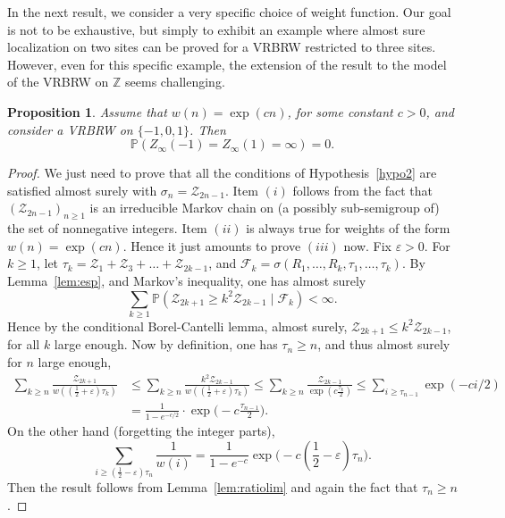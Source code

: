 \documentclass[10pt,a4paper]{amsart}
\newtheorem {prop} {Proposition} [section]
\newcommand{\1}{{\text{\Large $\mathfrak 1$}}}
\begin{document}
In the next result, we consider a very specific choice of weight function. Our goal is not to be exhaustive, but simply 
to exhibit an example where almost sure localization on 
two sites can be proved for a VRBRW restricted to three sites. However, even for this specific example, the extension of the result to the model of the VRBRW on $\mathbb Z$ seems challenging. 
\begin{prop}\label{prop:appVRBRW}
Assume that $w(n) = \exp(cn)$, for some constant $c>0$, and consider a VRBRW on $\{-1,0,1\}$. Then  
$$\mathbb  P(Z_\infty(-1)= Z_\infty(1) = \infty)= 0. $$ 
\end{prop}
\begin{proof}
We just need to prove that all the conditions of Hypothesis~\ref{hypo2} are satisfied almost surely with $\sigma_n = \mathcal Z_{2n-1}$. Item $(i)$ follows from the fact that $(\mathcal Z_{2n-1})_{n\ge 1}$ is an irreducible Markov chain on (a possibly sub-semigroup of) the set of nonnegative integers. Item $(ii)$ is always true for weights of the form $w(n) = \exp(cn)$. Hence it just amounts to prove $(iii)$ now. Fix $\varepsilon>0$. For $k\ge 1$, let $\tau_k = \mathcal Z_1 + \mathcal Z_3 + \dots + \mathcal Z_{2k-1}$, and $\mathcal F_k = \sigma(R_1,\dots,R_k,\tau_1,\dots,\tau_k)$. By Lemma~\ref{lem:esp}, and Markov's inequality, one has almost surely 
$$\sum_{k\ge 1} \mathbb P(\mathcal Z_{2k+1} \ge k^2 \mathcal Z_{2k-1}\mid \mathcal F_k) < \infty. $$ 
Hence by the conditional Borel-Cantelli lemma, almost surely, $\mathcal Z_{2k+1} \le k^2 \mathcal Z_{2k-1}$, for all $k$ large enough. 
Now by definition, one has $\tau_n \ge n$, and thus almost surely for $n$ large enough, 
 \begin{align*}
\sum_{k\ge n} \frac{\mathcal Z_{2k+1}}{w((\frac 12 + \varepsilon)\tau_k)} & \le \sum_{k\ge n} \frac{k^2\mathcal Z_{2k-1}}{w((\frac 12 + \varepsilon)\tau_k)} 
\le \sum_{k\ge n} \frac{\mathcal Z_{2k-1}}{\exp(c\frac{\tau_k}{2})} 
 \le  \sum_{i\ge \tau_{n-1}} \exp(-ci/2)  \\
 & = \frac{1}{1- e^{-c/2}}\cdot \exp\big(-c\frac{ \tau_{n-1}}{2}\big).   
\end{align*}
On the other hand (forgetting the integer parts), 
$$\sum_{i\ge (\frac 12 - \varepsilon)\tau_n} \frac 1{w(i)} = \frac 1{1- e^{-c}} \exp\big(-c(\frac 12- \varepsilon)\tau_n\big). $$
Then the result follows from Lemma~\ref{lem:ratiolim} and again the fact that $\tau_n\ge n$.  
\end{proof}
\end{document}
